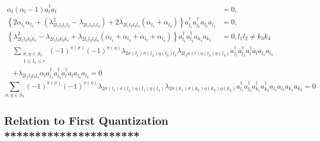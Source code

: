 \documentclass[aps,preprint]{revtex4}%
\begin{document}
\begin{subequations}
\begin{align}
\alpha_{l}\left(  \alpha_{l}-1\right)  a_{l}^{\dagger}a_{l}  &  =0,\nonumber\\
\left\{  2\alpha_{l_{1}}\alpha_{l_{2}}+\left(  \lambda_{2l_{1}l_{2}l_{1}l_{2}%
}^{2}-\lambda_{2l_{1}l_{2}l_{1}l_{2}}\right)  +2\lambda_{2l_{1}l_{2}l_{3}%
l_{4}}\left(  \alpha_{l_{1}}+\alpha_{l_{2}}\right)  \right\}  a_{l_{1}%
}^{\dagger}a_{l_{2}}^{\dagger}a_{l_{2}}a_{l_{1}}  &  =0,\nonumber\\
\left\{  \lambda_{2l_{1}l_{2}k_{3}k_{4}}^{2}-\lambda_{2l_{1}l_{2}k_{3}k_{4}%
}+\lambda_{2l_{1}l_{2}l_{3}l_{4}}\left(  \alpha_{l_{1}}+\alpha_{l_{2}}%
+\alpha_{l_{3}}+\alpha_{l_{4}}\right)  \right\}  a_{l_{1}}^{\dagger}a_{l_{2}%
}^{\dagger}a_{k_{4}}a_{k_{3}}  &  =0,l_{1}l_{2}\neq k_{3}k_{4}%
\end{align}%
\end{subequations}
\begin{align}
&  \sum_{\substack{\sigma,\eta\in S_{3}\\1\leq l_{4}\leq r}}\left(  -1\right)
^{\pi\left(  \sigma\right)  }\left(  -1\right)  ^{\pi\left(  \eta\right)
}\lambda_{2\sigma\left(  l_{1}\right)  \sigma\left(  l_{2}\right)  \eta\left(
l_{3}\right)  l_{4}}\lambda_{2l_{4}\sigma\left(  l\right)  \eta\left(
l_{3}\right)  \eta\left(  l_{4}\right)  }a_{l_{1}}^{\dagger}a_{l_{2}}%
^{\dagger}a_{l}^{\dagger}a_{l}a_{l_{4}}a_{l_{3}}\\
&  +\lambda_{2l_{1}l_{2}l_{3}l_{4}}\alpha_{l}a_{l_{1}}^{\dagger}a_{l_{2}%
}^{\dagger}a_{l}^{\dagger}a_{l}a_{l_{4}}a_{l_{3}}\left.  =\right.  0
\end{align}%
\begin{equation}
\sum_{\sigma,\eta\in S_{3}}\left(  -1\right)  ^{\pi\left(  \sigma\right)
}\left(  -1\right)  ^{\pi\left(  \eta\right)  }\lambda_{2\sigma\left(
l_{1}\right)  \sigma\left(  l_{2}\right)  \eta\left(  l_{3}\right)
\eta\left(  l_{4}\right)  }\lambda_{2\sigma\left(  k_{1}\right)  \sigma\left(
k_{2}\right)  \eta\left(  k_{3}\right)  \eta\left(  k_{4}\right)  }a_{l_{1}%
}^{\dagger}a_{l_{2}}^{\dagger}a_{k_{1}}^{\dagger}a_{k_{2}}^{\dagger}a_{l_{4}%
}a_{l_{3}}a_{k_{4}}a_{k_{3}}=0
\end{equation}


\subsection{Relation to First Quantization **********************}
\end{document}
